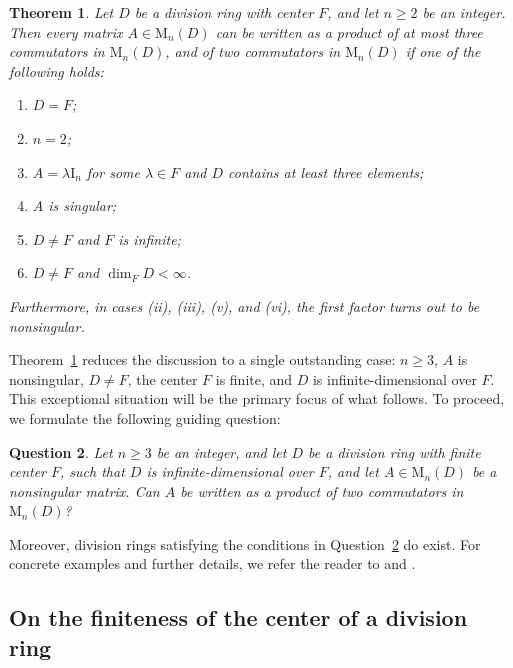 \documentclass[11pt]{article}
\newtheorem{theorem}{Theorem}
\newtheorem{question}[theorem]{Question}
\theoremstyle{definition}
\begin{document}
{{{{				\begin{theorem}\label{recent}
					Let $D$ be a division ring with center $F$, and let $n \geq 2$ be an integer. Then every matrix $A \in \mathrm{M}_n(D)$ can be written as a product of at most three commutators in $\mathrm{M}_n(D)$, and of two commutators in $\mathrm{M}_n(D)$ if one of the following holds:
					\begin{enumerate}[\rm (i)]
						\item $D = F$;
						\item $n = 2$;
						\item  $A=\lambda\mathrm{I}_n$ for some $\lambda\in F$ and $D$ contains at least three elements;
						\item $A$ is singular;
						\item $D \ne F$ and $F$ is infinite;
						\item $D \ne F$ and $\dim_F D < \infty$.
					\end{enumerate} Furthermore, in cases (ii), (iii), (v), and (vi), the first factor turns out to be nonsingular.
				\end{theorem}
				
				
				
				Theorem~\ref{recent} reduces the discussion to a single outstanding case: $n\geq3$, $A$ is nonsingular, $D \ne F$, the center $F$ is finite, and $D$ is infinite-dimensional over $F$. This exceptional situation will be the primary focus of what follows. To proceed, we formulate the following guiding question:
				
				\begin{question}\label{que}
					Let $n\geq3$ be an integer, and let \( D \) be a division ring with finite center \( F \), such that \( D \) is infinite-dimensional over \( F \), and let \( A \in \mathrm{M}_n(D) \) be a nonsingular matrix. Can \( A \) be written as a product of two  commutators in \( \mathrm{M}_n(D) \)?
				\end{question}
				
				Moreover, division rings satisfying the conditions in Question~\ref{que} do exist. For concrete examples and further details, we refer the reader to \cite[$\S4$, Example~3]{Pa_ChuLee_79} and \cite[Proposition~2.3.5]{Bo_Cohn_95}.
				
				\subsection{On the finiteness of the center of a division ring}
				
}}}}
\end{document}
